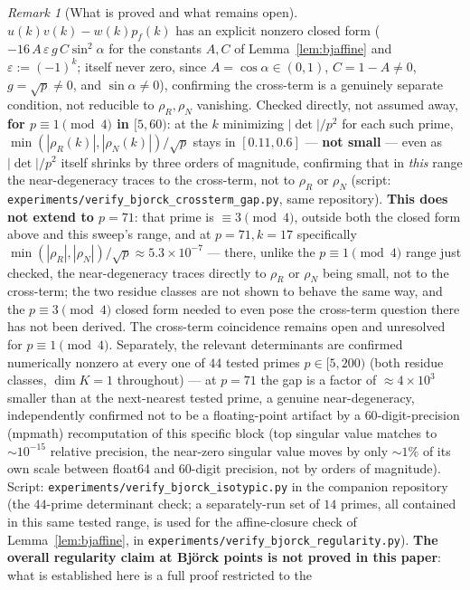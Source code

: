 \documentclass[11pt]{article}
\theoremstyle{plain}
\theoremstyle{definition}
\theoremstyle{remark}
\newtheorem{remark}[theorem]{Remark}
\begin{document}
\begin{remark}[What is proved and what remains open]
$u(k)v(k)-w(k)p_f(k)$ has an explicit nonzero closed form
($-16\,A\,\varepsilon\,g\,C\sin^2\alpha$ for the constants $A,C$ of
Lemma~\ref{lem:bjaffine} and $\varepsilon:=(-1)^k$; itself never zero,
since $A=\cos\alpha\in(0,1)$, $C=1-A\ne0$, $g=\sqrt p\ne0$, and
$\sin\alpha\ne0$), confirming the
cross-term is a genuinely separate condition, not reducible to $\rho_R,
\rho_N$ vanishing. Checked directly, not assumed away, \textbf{for
$p\equiv1\pmod4$ in $[5,60)$}: at the $k$ minimizing $|\det|/p^2$ for each
such prime, $\min(|\rho_R(k)|,|\rho_N(k)|)/\sqrt p$ stays in $[0.11,0.6]$
--- \textbf{not small} --- even as $|\det|/p^2$ itself shrinks by three
orders of magnitude, confirming that in \emph{this} range the
near-degeneracy traces to the cross-term, not to $\rho_R$ or $\rho_N$
(script: {\tt experiments/verify\_bjorck\_crossterm\_gap.py}, same
repository). \textbf{This does not extend to $p=71$}: that prime is
$\equiv3\pmod4$, outside both the closed form above and this sweep's
range, and at $p=71,k=17$ specifically $\min(|\rho_R|,|\rho_N|)/\sqrt p
\approx5.3\times10^{-7}$ --- there, unlike the $p\equiv1\pmod4$ range
just checked, the near-degeneracy traces directly to $\rho_R$ or $\rho_N$
being small, not to the cross-term; the two residue classes are not
shown to behave the same way, and the $p\equiv3\pmod4$ closed form
needed to even pose the cross-term question there has not been derived.
The cross-term coincidence remains open and unresolved for
$p\equiv1\pmod4$. Separately, the
relevant determinants are confirmed numerically nonzero at every one of
$44$ tested primes $p\in[5,200)$ (both residue classes, $\dim K=1$
throughout) --- at $p=71$ the gap is a factor of $\approx4\times10^3$
smaller than at the next-nearest tested prime, a genuine near-degeneracy,
independently confirmed not to be a floating-point artifact by a
$60$-digit-precision (mpmath) recomputation of this specific block (top
singular value matches to $\sim10^{-15}$ relative precision, the
near-zero singular value moves by only $\sim1\%$ of its own scale between
float64 and $60$-digit precision, not by orders of magnitude). Script:
{\tt experiments/verify\_bjorck\_isotypic.py} in the companion repository
\cite{CazacAlgorithmRepo} (the $44$-prime determinant check; a
separately-run set of $14$ primes, all contained in this same tested
range, is used for the affine-closure check of Lemma~\ref{lem:bjaffine},
in {\tt experiments/verify\_bjorck\_regularity.py}).
\textbf{The overall regularity claim at Bj\"orck points is not proved in
this paper}: what is established here is a full proof restricted to the

\end{remark}
\end{document}
